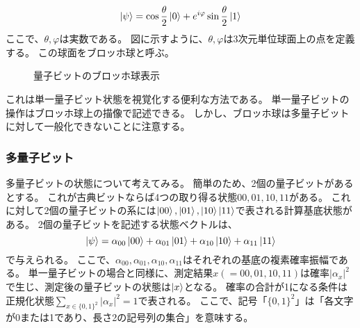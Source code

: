 \documentclass[platex,dvipdfmx, titlepage]{jlreq}			%
\begin{document}

\begin{equation}
    \label{eq: QuantumComputationAndQuantumInfomation.1.4}
    \ket{\psi} = \cos{\frac{\theta}{2}} \ket{0} + e^{i \varphi} \sin{\frac{\theta}{2}} \ket{1}
\end{equation}
ここで、$\theta, \varphi$は実数である。
図に示すように、$\theta, \varphi$は3次元単位球面上の点を定義する。
この球面をブロッホ球と呼ぶ。

\begin{figure}[htbp]
    \label{fig: bloch球}
    \centering
\caption{量子ビットのブロッホ球表示}
\end{figure}

これは単一量子ビット状態を視覚化する便利な方法である。
単一量子ビットの操作はブロッホ球上の描像で記述できる。
しかし、ブロッホ球は多量子ビットに対して一般化できないことに注意する。

\subsubsection{多量子ビット}
多量子ビットの状態について考えてみる。
簡単のため、2個の量子ビットがあるとする。
これが古典ビットならば4つの取り得る状態$00, 01, 10, 11$がある。
これに対して2個の量子ビットの系には$\ket{00}, \ket{01}, \ket{10} \ket{11}$で表される計算基底状態がある。
2個の量子ビットを記述する状態ベクトルは、
\begin{equation}
    \label{eq: QuantumComputationAndQuantumInfomation.1.5}
    \ket{\psi} = \alpha_{00} \ket{00} + \alpha_{01} \ket{01} + \alpha_{10} \ket{10} + \alpha_{11} \ket{11}
\end{equation}
で与えられる。
ここで、$\alpha_{00}, \alpha_{01}, \alpha_{10}, \alpha_{11}$はそれぞれの基底の複素確率振幅である。
単一量子ビットの場合と同様に、測定結果$x(= 00, 01, 10, 11)$は確率$|\alpha_x|^2$で生じ、測定後の量子ビットの状態は$\ket{x}$となる。
確率の合計が1になる条件は正規化状態$\sum_{x \in \{0, 1\}^2} |\alpha_x|^2 = 1$で表される。
ここで、記号「$\{0, 1\}^2$」は「各文字が0または1であり、長さ2の記号列の集合」を意味する。
\end{document}
